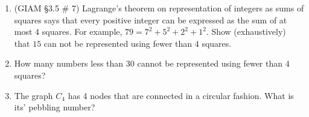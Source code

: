 \documentclass{amsart}
\begin{document}
\begin{enumerate}
\vfill

\item (GIAM \S 3.5 \# 7) Lagrange's theorem on representation of integers as sums of squares
says that every positive integer can be expressed as the sum of at most 
$4$ squares.  For example, $79 = 7^2 + 5^2 + 2^2 + 1^2$.  Show (exhaustively) 
that $15$ can not be represented using fewer than $4$ squares.

\vfill 

\newpage

\item How many numbers less than 30 cannot be represented using fewer than $4$ squares?

\vfill

\item The graph $C_4$ has 4 nodes that are connected in a circular fashion.  What is its' pebbling number?

\vfill

\end{enumerate}
\end{document}
